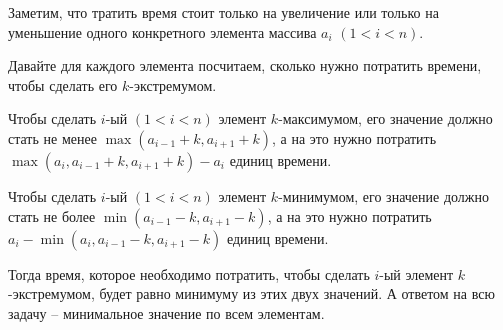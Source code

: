\solutionSection

Заметим, что тратить время стоит только на увеличение или только на уменьшение одного конкретного элемента массива $a_{i}$ $(1 < i < n)$.

Давайте для каждого элемента посчитаем, сколько нужно потратить времени, чтобы сделать его $k$-экстремумом.

Чтобы сделать $i$-ый $(1 < i < n)$ элемент $k$-максимумом, его значение должно стать не менее $\max(a_{i - 1} + k, a_{i + 1} + k)$, а на это нужно потратить $\max(a_{i}, a_{i - 1} + k, a_{i + 1} + k) - a_{i}$ единиц времени.

Чтобы сделать $i$-ый $(1 < i < n)$ элемент $k$-минимумом, его значение должно стать не более $\min(a_{i - 1} - k, a_{i + 1} - k)$, а на это нужно потратить $a_{i} - \min(a_{i}, a_{i - 1} - k, a_{i + 1} - k)$ единиц времени.

Тогда время, которое необходимо потратить, чтобы сделать $i$-ый элемент $k$-экстремумом, будет равно минимуму из этих двух значений. А ответом на всю задачу -- минимальное значение по всем элементам.

\codeExample

{}